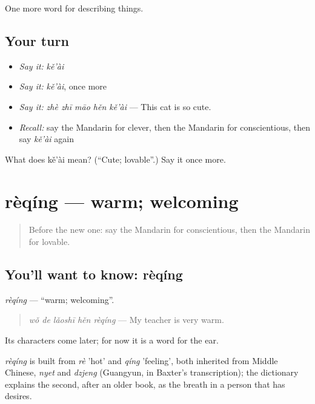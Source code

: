 \begin{grammarlens}[title={What you've built}]
One more word for describing things.
\end{grammarlens}

\subsection*{Your turn}
\begin{itemize}
\raggedright
  \item \emph{Say it:} \emph{kě'ài}
  \item \emph{Say it:} \emph{kě'ài}, once more
  \item \emph{Say it:} \emph{zhè zhī māo hěn kě'ài} — This cat is so cute.
  \item \emph{Recall:} say the Mandarin for clever, then the Mandarin for conscientious, then say \emph{kě'ài} again
\end{itemize}

\begin{tcolorbox}[breakable,colback=teal!4,colframe=teal!35!black,title={Before you move on}]
What does kě'ài mean? (\textquotedblleft{}Cute; lovable\textquotedblright{}.) Say it once more.
\end{tcolorbox}
\section[rèqíng]{rèqíng — warm; welcoming}

\label{lesson:ZH-C123-reqing}



\begin{quote}
Before the new one: say the Mandarin for conscientious, then the Mandarin for lovable.
\end{quote}

\subsection*{You'll want to know: rèqíng}
\emph{rèqíng} — \textquotedblleft{}warm; welcoming\textquotedblright{}.

\begin{quote}
\emph{wǒ de lǎoshī hěn rèqíng} — My teacher is very warm.
\end{quote}

Its characters come later; for now it is a word for the ear.

\begin{cousinweb}
\emph{rèqíng} is built from \emph{rè} 'hot' and \emph{qíng} 'feeling', both inherited from Middle Chinese, \emph{nyet} and \emph{dzjeng} (Guangyun, in Baxter's transcription); the dictionary explains the second, after an older book, as the breath in a person that has desires.
\end{cousinweb}

